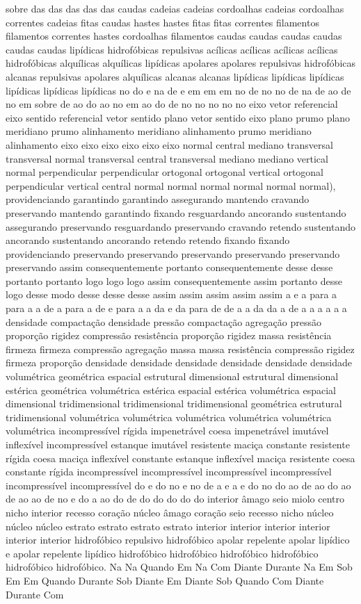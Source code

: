 sobre das das das das das caudas cadeias cadeias cordoalhas cadeias cordoalhas correntes cadeias fitas caudas hastes hastes fitas fitas correntes filamentos filamentos correntes hastes cordoalhas filamentos caudas caudas caudas caudas caudas caudas lipídicas hidrofóbicas repulsivas acílicas acílicas acílicas acílicas hidrofóbicas alquílicas alquílicas lipídicas apolares apolares repulsivas hidrofóbicas alcanas repulsivas apolares alquílicas alcanas alcanas lipídicas lipídicas lipídicas lipídicas lipídicas lipídicas no do e na de e em em em no de no no de na de ao de no em sobre de ao do ao no em ao do de no no no no no eixo vetor referencial eixo sentido referencial vetor sentido plano vetor sentido eixo plano prumo plano meridiano prumo alinhamento meridiano alinhamento prumo meridiano alinhamento eixo eixo eixo eixo eixo eixo normal central mediano transversal transversal normal transversal central transversal mediano mediano vertical normal perpendicular perpendicular ortogonal ortogonal vertical ortogonal perpendicular vertical central normal normal normal normal normal normal), providenciando garantindo garantindo assegurando mantendo cravando preservando mantendo garantindo fixando resguardando ancorando sustentando assegurando preservando resguardando preservando cravando retendo sustentando ancorando sustentando ancorando retendo retendo fixando fixando providenciando preservando preservando preservando preservando preservando preservando assim consequentemente portanto consequentemente desse desse portanto portanto logo logo logo assim consequentemente assim portanto desse logo desse modo desse desse desse assim assim assim assim assim a e a para a para a a de a para a de e para a a da e da para de de a a da da a de a a a a a a densidade compactação densidade pressão compactação agregação pressão proporção rigidez compressão resistência proporção rigidez massa resistência firmeza firmeza compressão agregação massa massa resistência compressão rigidez firmeza proporção densidade densidade densidade densidade densidade densidade volumétrica geométrica espacial estrutural dimensional estrutural dimensional estérica geométrica volumétrica estérica espacial estérica volumétrica espacial dimensional tridimensional tridimensional tridimensional geométrica estrutural tridimensional volumétrica volumétrica volumétrica volumétrica volumétrica volumétrica incompressível rígida impenetrável coesa impenetrável imutável inflexível incompressível estanque imutável resistente maciça constante resistente rígida coesa maciça inflexível constante estanque inflexível maciça resistente coesa constante rígida incompressível incompressível incompressível incompressível incompressível incompressível do e do no e no de a e a e do no do ao de ao do ao de ao ao de no e do a ao do de do do do do do interior âmago seio miolo centro nicho interior recesso coração núcleo âmago coração seio recesso nicho núcleo núcleo núcleo estrato estrato estrato estrato interior interior interior interior interior interior hidrofóbico repulsivo hidrofóbico apolar repelente apolar lipídico e apolar repelente lipídico hidrofóbico hidrofóbico hidrofóbico hidrofóbico hidrofóbico hidrofóbico. Na Na Quando Em Na Com Diante Durante Na Em Sob Em Em Quando Durante Sob Diante Em Diante Sob Quando Com Diante Durante Com 